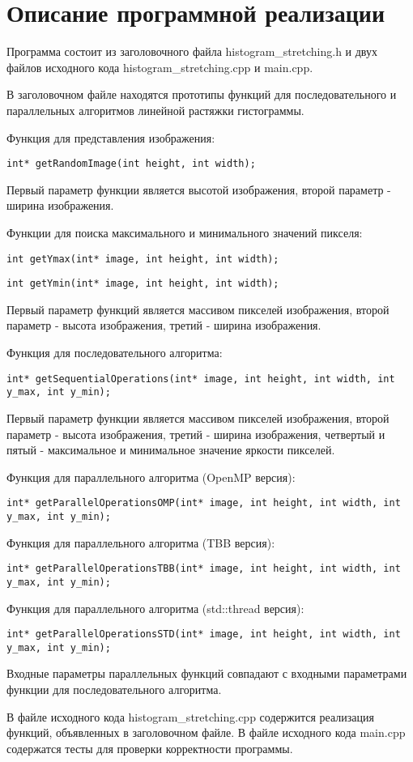 \documentclass{report}
\begin{document}
\section*{Описание программной реализации}
Программа состоит из заголовочного файла histogram\_stretching.h и двух файлов исходного кода histogram\_stretching.cpp и main.cpp.
\par В заголовочном файле находятся прототипы функций для последовательного и параллельных алгоритмов линейной растяжки гистограммы.
\par Функция для представления изображения:
\begin{lstlisting}
int* getRandomImage(int height, int width);
\end{lstlisting}
Первый параметр функции является высотой изображения, второй параметр - ширина изображения.
\par Функции для поиска максимального и минимального значений пикселя:
\begin{lstlisting}
int getYmax(int* image, int height, int width);
\end{lstlisting}
\begin{lstlisting}
int getYmin(int* image, int height, int width);
\end{lstlisting}
Первый параметр функций является массивом пикселей изображения, второй параметр - высота изображения, третий - ширина изображения.
\par Функция для последовательного алгоритма:
\begin{lstlisting}
int* getSequentialOperations(int* image, int height, int width, int y_max, int y_min);
\end{lstlisting}
Первый параметр функции является массивом пикселей изображения, второй параметр - высота изображения, третий - ширина изображения, четвертый и пятый - максимальное и минимальное значение яркости пикселей.
\par Функция для параллельного алгоритма (OpenMP версия):
\begin{lstlisting}
int* getParallelOperationsOMP(int* image, int height, int width, int y_max, int y_min);
\end{lstlisting}
\par Функция для параллельного алгоритма (TBB версия):
\begin{lstlisting}
int* getParallelOperationsTBB(int* image, int height, int width, int y_max, int y_min);
\end{lstlisting}
\par Функция для параллельного алгоритма (std::thread версия):
\begin{lstlisting}
int* getParallelOperationsSTD(int* image, int height, int width, int y_max, int y_min);
\end{lstlisting}
Входные параметры параллельных функций совпадают с входными параметрами функции для последовательного алгоритма.
\par В файле исходного кода histogram\_stretching.cpp содержится реализация функций, объявленных в заголовочном файле. В файле исходного кода main.cpp содержатся тесты для проверки корректности программы.
\newpage
\end{document}
